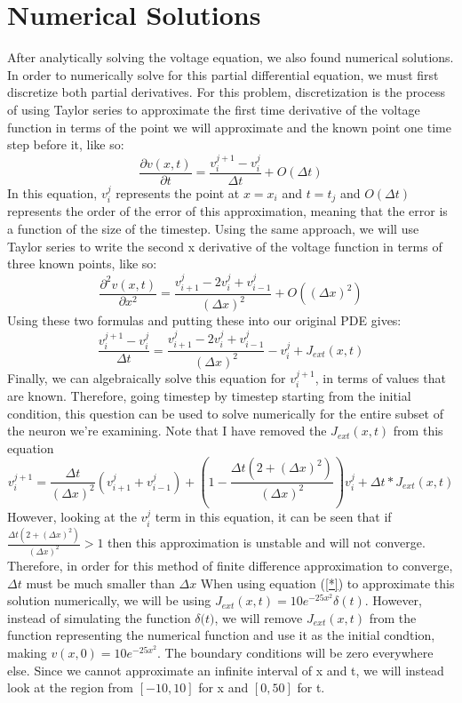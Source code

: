 \documentclass[12pt]{article}
\begin{document}
\section{Numerical Solutions}
After analytically solving the voltage equation, we also found numerical solutions. In order to numerically solve for this partial differential equation, we must first discretize both partial derivatives. For this problem, discretization is the process of using Taylor series to approximate the first time derivative of the voltage function in terms of the point we will approximate and the known point one time step before it, like so:
\[\frac{\partial{v(x,t)}}{\partial{t}}=\frac{v^{j+1}_i-v^j_i}{\Delta{t}}+O(\Delta{t})\]
In this equation, $v^j_i$ represents the point at $x=x_i$ and $t=t_j$ and $O(\Delta{t})$ represents the order of the error of this approximation, meaning that the error is a function of the size of the timestep.
Using the same approach, we will use Taylor series to write the second x derivative of the voltage function in terms of three known points, like so:
\[\frac{\partial^2{v(x,t)}}{\partial{x}^2}=\frac{v^{j}_{i+1}-2v^j_i+v^j_{i-1}}{(\Delta{x})^2}+O((\Delta{x})^2)\]
Using these two formulas and putting these into our original PDE gives:
\[\frac{v^{j+1}_i-v^j_i}{\Delta{t}}=\frac{v^{j}_{i+1}-2v^j_i+v^j_{i-1}}{(\Delta{x})^2}-v^j_i+J_{ext}(x,t)\]
Finally, we can algebraically solve this equation for $v^{j+1}_i$, in terms of values that are known. Therefore, going timestep by timestep starting from the initial condition, this question can be used to solve numerically for the entire subset of the neuron we're examining. Note that I have removed the $J_{ext}(x,t)$ from this equation
\begin{equation} \label{*}
v^{j+1}_i=\frac{\Delta{t}}{(\Delta{x})^2}(v^{j}_{i+1}+v^{j}_{i-1})+(1-\frac{\Delta{t}(2+(\Delta{x})^2)}{(\Delta{x})^2})v^{j}_{i}+\Delta{t}*J_{ext}(x,t)
\end {equation}
However, looking at the $v^{j}_{i}$ term in this equation, it can be seen that if $\frac{\Delta{t}(2+(\Delta{x})^2)}{(\Delta{x})^2}>1$ then this approximation is unstable and will not converge. Therefore, in order for this method of finite difference approximation to converge, $\Delta{t}$ must be much smaller than $\Delta{x}$ 
When using equation (\ref{*}) to approximate this solution numerically, we will be using $J_{ext}(x,t)=10e^{-25x^2}\delta{(t)}$. However, instead of simulating the function $\delta{(t})$, we will remove $J_{ext}(x,t)$ from the function representing the numerical function and use it as the initial condtion, making $v(x,0)=10e^{-25x^2}$. The boundary conditions will be zero everywhere else. Since we cannot approximate an infinite interval of x and t, we will instead look at the region from $[-10,10]$ for x and $[0,50]$ for t. 
\end{document}
